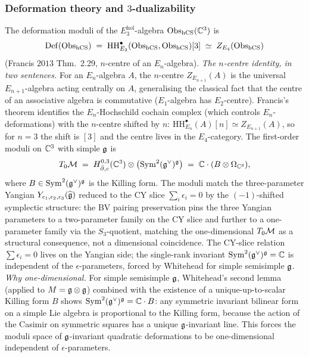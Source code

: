 \subsubsection{Deformation theory and $3$-dualizability}

\begin{theorem}
\label{wn:thm:spine-deformations}
The deformation moduli of the $E_3^{\mathrm{hol}}$-algebra
$\mathrm{Obs}_{\mathrm{hCS}}(\mathbb{C}^3)$ is
\[
\mathrm{Def}(\mathrm{Obs}_{\mathrm{hCS}}) \;=\; \mathrm{HH}^{\bullet}_{E_3}
(\mathrm{Obs}_{\mathrm{hCS}}, \mathrm{Obs}_{\mathrm{hCS}})[3] \;\simeq\; Z_{E_4}(\mathrm{Obs}_{\mathrm{hCS}})
\]
(Francis $2013$ Thm.~2.29, $n$-centre of an $E_n$-algebra).
\emph{The $n$-centre identity, in two sentences.} For an
$E_n$-algebra $A$, the $n$-centre $Z_{E_{n+1}}(A)$ is the universal
$E_{n+1}$-algebra acting centrally on $A$, generalising the classical
fact that the centre of an associative algebra is commutative
($E_1$-algebra has $E_2$-centre). Francis's theorem identifies the
$E_n$-Hochschild cochain complex (which controls $E_n$-deformations)
with the $n$-centre shifted by $n$: $\mathrm{HH}^{\bullet}_{E_n}(A)[n]
\simeq Z_{E_{n+1}}(A)$, so for $n = 3$ the shift is $[3]$ and the
centre lives in the $E_4$-category. The
first-order moduli on $\mathbb{C}^3$ with simple $\mathfrak{g}$ is
\[
T_0 \mathcal{M} \;=\; H^{0,3}_{\bar\partial, c}(\mathbb{C}^3) \otimes
\bigl(\mathrm{Sym}^2(\mathfrak{g}^\vee)^{\mathfrak{g}}\bigr) \;=\;
\mathbb{C} \cdot (B \otimes \Omega_{\mathbb{C}^3}),
\]
where $B \in \mathrm{Sym}^2(\mathfrak{g}^\vee)^{\mathfrak{g}}$ is the Killing form.
The moduli match the three-parameter Yangian
$Y_{\epsilon_1, \epsilon_2, \epsilon_3}(\widehat{\mathfrak{g}})$ reduced to the
CY slice $\sum_i \epsilon_i = 0$ by the $(-1)$-shifted symplectic
structure: the BV pairing preservation pins the three Yangian
parameters to a two-parameter family on the CY slice and further to a
one-parameter family via the $S_3$-quotient, matching the
one-dimensional $T_0\mathcal{M}$ as a structural consequence, not a dimensional
coincidence. The CY-slice relation $\sum\epsilon_i = 0$ lives on the
Yangian side; the single-rank invariant
$\mathrm{Sym}^2(\mathfrak{g}^\vee)^{\mathfrak{g}} = \mathbb{C}$ is independent of the
$\epsilon$-parameters, forced by Whitehead for simple semisimple $\mathfrak{g}$.
\emph{Why one-dimensional.} For simple semisimple $\mathfrak{g}$, Whitehead's
second lemma (applied to $M = \mathfrak{g} \otimes \mathfrak{g}$) combined with the
existence of a unique-up-to-scalar Killing form $B$ shows
$\mathrm{Sym}^2(\mathfrak{g}^\vee)^{\mathfrak{g}} = \mathbb{C} \cdot B$: any symmetric
invariant bilinear form on a simple Lie algebra is proportional to
the Killing form, because the action of the Casimir on symmetric
squares has a unique $\mathfrak{g}$-invariant line. This forces the moduli
space of $\mathfrak{g}$-invariant quadratic deformations to be one-dimensional
independent of $\epsilon$-parameters.
\end{theorem}

